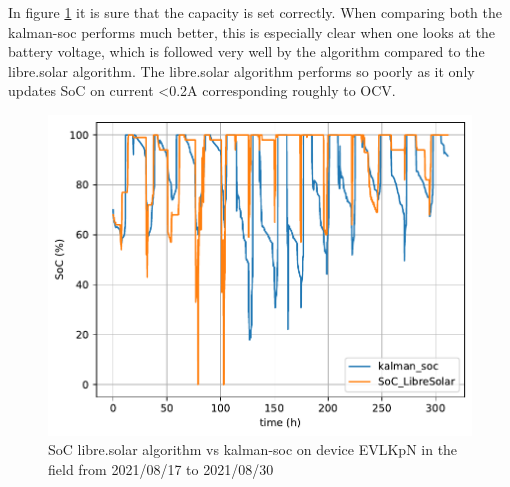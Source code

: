 \pagebreak

In figure \ref{fig:librevskalman-EVLKpN} it is sure that the capacity is set correctly. When comparing both the kalman-soc performs much better, this is especially clear when one looks at the battery voltage, which is followed very well by the algorithm compared to the libre.solar algorithm. The libre.solar algorithm performs so poorly as it only updates SoC on current <0.2A corresponding roughly to OCV. 


\begin{figure}[h!]
\centering	
\includegraphics{EVLKpN_20210817-20210830-librevskalman.pdf}
\caption{\label{fig:librevskalman-EVLKpN} SoC libre.solar algorithm vs kalman-soc on device EVLKpN in the field from 2021/08/17 to 2021/08/30 }
\end{figure}


%
%
	


